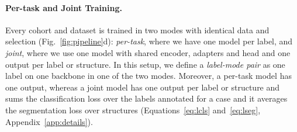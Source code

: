 \paragraph{Per-task and Joint Training.} Every cohort and dataset is trained in two modes with identical data and selection (Fig.~\ref{fig:pipeline}d): \emph{per-task}, where we have one model per label, and \emph{joint}, where we use one model with shared encoder, adapters and head and one output per label or structure. In this setup, we define a \emph{label-mode pair} as one label on one backbone in one of the two modes. Moreover, a per-task model has one output, whereas a joint model has one output per label or structure and sums the classification loss over the labels annotated for a case and it averages the segmentation loss over structures (Equations~\ref{eq:lcls} and~\ref{eq:lseg}, Appendix~\ref{app:details}).
